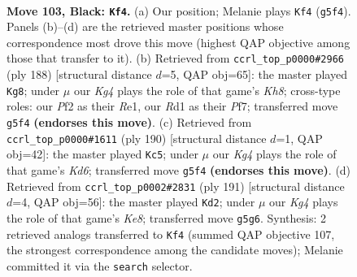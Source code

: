 \documentclass[11pt]{article}
\begin{document}
\clearpage

\begin{figure}[p]\centering
\begin{subfigure}{0.46\textwidth}\centering
\resizebox{\linewidth}{!}{%
\newchessgame
\chessboard[
  setfen={8/8/8/1R4k1/8/7K/5p2/3r4 b - - 21 103},
  showmover=false,
  pgfstyle=straightmove, color=movearrow, markmove={g5-f4}
]}
\caption{}
\end{subfigure}\hfill
\begin{subfigure}{0.46\textwidth}\centering
\resizebox{\linewidth}{!}{%
\newchessgame
\chessboard[
  setfen={7K/5P2/3k4/8/8/7r/6p1/4R3 w - - 16 95},
  showmover=false,
  pgfstyle=straightmove, color=movearrow, markmove={h8-g8}
]}
\caption{}
\end{subfigure}
\\[4pt]
\begin{subfigure}{0.46\textwidth}\centering
\resizebox{\linewidth}{!}{%
\newchessgame
\chessboard[
  setfen={3k4/7R/3K2r1/8/3P4/8/8/8 w - - 19 96},
  showmover=false,
  pgfstyle=straightmove, color=movearrow, markmove={d6-c5}
]}
\caption{}
\end{subfigure}\hfill
\begin{subfigure}{0.46\textwidth}\centering
\resizebox{\linewidth}{!}{%
\newchessgame
\chessboard[
  setfen={8/7r/8/8/4p3/4P3/6K1/R3k3 b - - 13 96},
  showmover=false,
  pgfstyle=straightmove, color=movearrow, markmove={e1-d2}
]}
\caption{}
\end{subfigure}
\caption{\textbf{Move 103, Black: \texttt{Kf4}.} (a) Our position; Melanie plays \texttt{Kf4} (\texttt{g5f4}). Panels (b)--(d) are the retrieved master positions whose correspondence most drove this move (highest QAP objective among those that transfer to it). (b) Retrieved from \texttt{ccrl\_top\_p0000\#2966} (ply 188) [structural distance $d$=5, QAP obj=65]: the master played \texttt{Kg8}; under $\mu$ our \emph{Kg4} plays the role of that game's \emph{Kh8}; cross-type roles: our \emph{P}f2 as their \emph{R}e1, our \emph{R}d1 as their \emph{P}f7; transferred move \texttt{g5f4} \textbf{(endorses this move)}. (c) Retrieved from \texttt{ccrl\_top\_p0000\#1611} (ply 190) [structural distance $d$=1, QAP obj=42]: the master played \texttt{Kc5}; under $\mu$ our \emph{Kg4} plays the role of that game's \emph{Kd6}; transferred move \texttt{g5f4} \textbf{(endorses this move)}. (d) Retrieved from \texttt{ccrl\_top\_p0002\#2831} (ply 191) [structural distance $d$=4, QAP obj=56]: the master played \texttt{Kd2}; under $\mu$ our \emph{Kg4} plays the role of that game's \emph{Ke8}; transferred move \texttt{g5g6}. Synthesis: 2 retrieved analogs transferred to \texttt{Kf4} (summed QAP objective 107, the strongest correspondence among the candidate moves); Melanie committed it via the \texttt{search} selector.}
\label{fig:thought-m205}
\end{figure}
\end{document}
